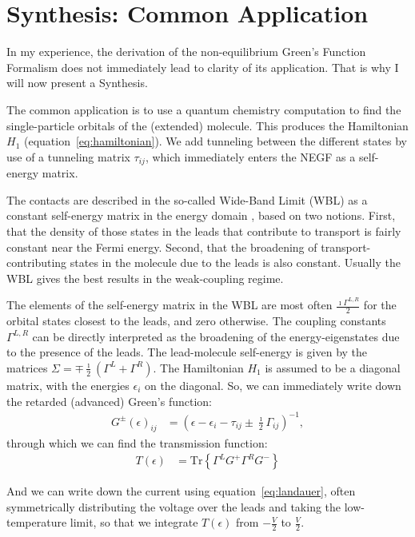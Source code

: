 \section{Synthesis: Common Application}
\label{sec:synthesis}


In my experience, the derivation of the non-equilibrium Green's Function Formalism does not immediately lead to clarity of its application. That is why I will now present a Synthesis.

The common application is to use a quantum chemistry computation to find the single-particle orbitals of the (extended) molecule. This produces the Hamiltonian $H_1$ (equation~\ref{eq:hamiltonian}). We add tunneling between the different states by use of a tunneling matrix $\tau_{ij}$, which immediately enters the NEGF as a self-energy matrix. 

The contacts are described in the so-called Wide-Band Limit (WBL) as a constant self-energy matrix in the energy domain \cite{wbl}, based on two notions. First, that the density of those states in the leads that contribute to transport  is fairly constant near the Fermi energy. Second, that the broadening of transport-contributing states in the molecule due to the leads is also constant. Usually the WBL gives the best results in the weak-coupling regime.

The elements of the self-energy matrix in the WBL are most often $\frac{\imath \Gamma^{L,R}}{2}$ for the orbital states closest to the leads, and zero otherwise. The coupling constants $\Gamma^{L,R}$ can be directly interpreted as the broadening of the energy-eigenstates due to the presence of the leads. The lead-molecule self-energy is given by the matrices $\Sigma = \mp \frac{\imath}{2} \left( \Gamma^L + \Gamma^R \right)$. The Hamiltonian $H_1$ is assumed to be a diagonal matrix, with the energies $\epsilon_i$ on the diagonal. So, we can immediately write down the retarded (advanced) Green's function:
\begin{align}
G^\pm(\epsilon)_{ij} &= \left(\epsilon - \epsilon_i - \tau_{ij} \pm \frac{\imath}{2} \Gamma_{ij}\right)^{-1}
\label{eq:commongf},
\end{align}
through which we can find the transmission function:
\begin{align}
T(\epsilon) &= \text{Tr}\left\{\Gamma^L G^+ \Gamma^R G^-\right\}
\label{eq:commonte}
\end{align}

And we can write down the current using equation~\ref{eq:landauer}, often symmetrically distributing the voltage over the leads and taking the low-temperature limit, so that we integrate $T(\epsilon)$ from $-\frac{V}{2}$ to $\frac{V}{2}$. 



\clearpage
{}